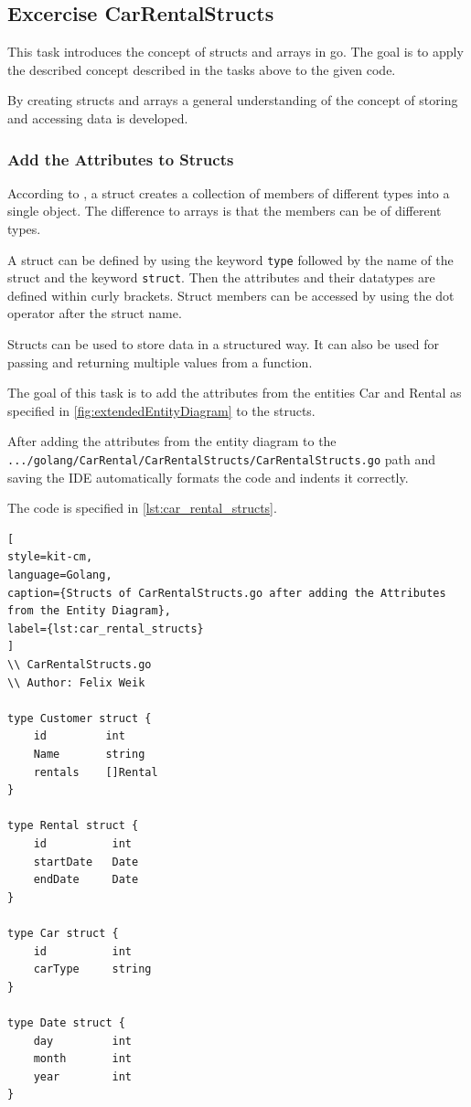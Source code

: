\subsection{Excercise CarRentalStructs}
\label{sec:car_rental_structs}
This task introduces the concept of structs and arrays in go.
The goal is to apply the described concept described in the tasks above to the given code.

By creating structs and arrays a general understanding of the concept of storing and accessing data is developed.

\subsubsection*{Add the Attributes to Structs}
According to \cite{W3S-STR}, a struct creates a collection of members of different types into a single object.
The difference to arrays is that the members can be of different types.

A struct can be defined by using the keyword \texttt{type} followed by the name of the struct and the keyword \texttt{struct}.
Then the attributes and their datatypes are defined within curly brackets.
Struct members can be accessed by using the dot operator after the struct name.

Structs can be used to store data in a structured way.
It can also be used for passing and returning multiple values from a function.

The goal of this task is to add the attributes from the entities Car and Rental as specified in \autoref{fig:extendedEntityDiagram} to the structs.

After adding the attributes from the entity diagram to the \hfill \newline \texttt{.../golang/CarRental/CarRentalStructs/CarRentalStructs.go} path and saving
the IDE automatically formats the code and indents it correctly.

The code is specified in \autoref{lst:car_rental_structs}.
\begin{lstlisting}[
style=kit-cm,
language=Golang,
caption={Structs of CarRentalStructs.go after adding the Attributes from the Entity Diagram},
label={lst:car_rental_structs}
]
\\ CarRentalStructs.go
\\ Author: Felix Weik

type Customer struct {
	id         int
	Name       string
	rentals    []Rental
}

type Rental struct {
	id          int
	startDate   Date
    endDate     Date
}

type Car struct {
	id          int
	carType     string
}

type Date struct {
	day         int 
    month       int 
    year        int 
}
\end{lstlisting}

